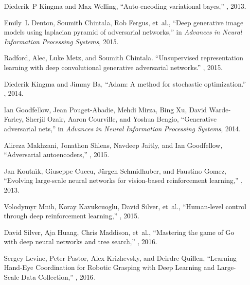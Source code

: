 \documentclass{article} %
\begin{document}
\begin{thebibliography}{10}

Diederik~P Kingma and Max Welling,
\newblock ``Auto-encoding variational bayes,''
, 2013.

Emily~L Denton, Soumith Chintala, Rob Fergus, et~al.,
\newblock ``Deep generative image models using laplacian pyramid of
  adversarial networks,''
\newblock in {\em Advances in Neural Information Processing Systems}, 2015.

Radford, Alec, Luke Metz, and Soumith Chintala.
\newblock ``Unsupervised representation learning with deep convolutional generative adversarial networks.''
, 2015.

Diederik Kingma and Jimmy Ba,
\newblock ``Adam: A method for stochastic optimization.''
, 2014.

Ian Goodfellow, Jean Pouget-Abadie, Mehdi Mirza, Bing Xu, David Warde-Farley,
  Sherjil Ozair, Aaron Courville, and Yoshua Bengio,
\newblock ``Generative adversarial nets,''
\newblock in {\em Advances in Neural Information Processing Systems}, 2014.

Alireza Makhzani, Jonathon Shlens, Navdeep Jaitly, and Ian Goodfellow,
\newblock ``Adversarial autoencoders,''
, 2015.

Jan Koutn{\'\i}k, Giuseppe Cuccu, J{\"u}rgen Schmidhuber, and Faustino Gomez,
\newblock ``Evolving large-scale neural networks for vision-based reinforcement learning,''
, 2013.

Volodymyr Mnih, Koray Kavukcuoglu, David Silver, et~al.,
\newblock ``Human-level control through deep reinforcement learning,''
, 2015.

David Silver, Aja Huang, Chris Maddison, et~al.,
\newblock ``Mastering the game of Go with deep neural networks and tree search,''
, 2016.

Sergey Levine, Peter Pastor, Alex Krizhevsky, and Deirdre Quillen,
\newblock ``Learning Hand-Eye Coordination for Robotic Grasping with Deep Learning and Large-Scale Data Collection,''
, 2016.


\end{thebibliography}
\end{document}
